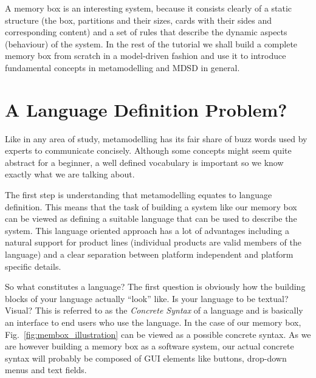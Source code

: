 A memory box is an interesting system, because it consists clearly of a static
structure (the box, partitions and their sizes, cards with their sides and
corresponding content) and a set of rules that describe the dynamic aspects 
(behaviour) of the system.  In the rest of the tutorial we shall build a
complete memory box from scratch in a model-driven fashion and use it to
introduce fundamental concepts in metamodelling and MDSD in general.  

\section*{A Language Definition Problem?}

Like in any area of study, metamodelling has its fair share of buzz words used
by experts to communicate concisely.  Although some concepts might seem quite
abstract for a beginner, a well defined vocabulary is important so we know
exactly what we are talking about.   

The first step is understanding that metamodelling equates to language
definition.  This means that the task of building a system like our memory box
can be viewed as defining a suitable language that can be used to describe the
system.  This language oriented approach has a lot of advantages including a
natural support for product lines (individual products are valid members of the
language) and a clear separation between platform independent and platform
specific details.      

So what constitutes a language?  The first question is obviously  how the
building blocks of your language actually ``look'' like.  Is your language to be
textual?  Visual?  This is referred to as the \emph{Concrete Syntax} of a
language and is basically an interface to end users who use the language.  
In the case of our memory box, Fig.~\ref{fig:membox_illustration} can be viewed
as a possible concrete syntax.  As we are however building a memory box as a
software system, our actual concrete syntax  will probably be composed of GUI
elements like buttons, drop-down menus and text fields.   

